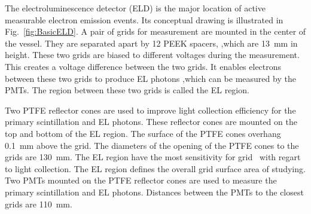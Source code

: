 The electroluminescence detector (ELD) is the major location of active measurable electron emission events. Its conceptual drawing is illustrated in Fig.~\ref{fig:BasicELD}. A pair of grids for measurement are mounted in the center of the vessel. They are separated apart by 12 PEEK spacers, ,which are \SI{13}{\mm} in height. These two grids are biased to different voltages during the measurement. This creates a voltage difference between the two grids. It enables electrons between these two grids to produce EL photons ,which can be measured by the PMTs. The region between these two grids is called the EL region. 


Two PTFE reflector cones are used to improve light collection efficiency for the primary scintillation and EL photons. These reflector cones are mounted on the top and bottom of the EL region. The surface of the PTFE cones overhang \SI{0.1}{mm} above the grid. The diameters of the opening of the PTFE cones to the grids are \SI{130}{mm}. The EL region have the most sensitivity for grid \ees\ with regart to light collection. The EL region defines the overall grid surface area of studying. Two PMTs mounted on the PTFE reflector cones are used to measure the primary scintillation and EL photons. Distances between the PMTs to the closest grids are \SI{110}{\mm}.

